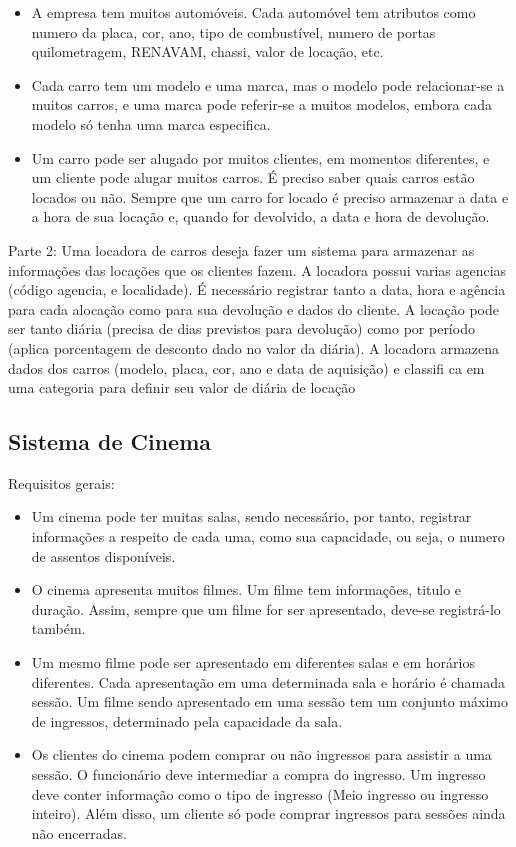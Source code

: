 \documentclass[a4paper,10pt]{article}
\begin{document}
\begin{itemize}
	\item A empresa tem muitos automóveis. Cada automóvel tem atributos como numero da placa, cor, ano, tipo de combustível, numero de portas quilometragem, RENAVAM, chassi, valor de locação, etc.
	\item  Cada carro tem um modelo e uma marca, mas o modelo pode relacionar-se a muitos carros, e uma marca pode referir-se a muitos modelos, embora cada modelo só tenha uma marca especifica.
	\item Um carro pode ser alugado por muitos clientes, em momentos diferentes, e um cliente pode alugar muitos carros. É preciso saber quais carros estão locados ou não. Sempre que um carro for locado é preciso armazenar a data e a hora de sua locação e, quando for devolvido, a data e hora de devolução.
\end{itemize}

Parte 2: Uma locadora de carros deseja fazer um sistema para armazenar as informações das
locações que os clientes fazem. A locadora possui varias agencias (código agencia, e localidade).
É necessário registrar tanto a data, hora e agência para cada alocação como para sua devolução e
dados do cliente. A locação pode ser tanto diária (precisa de dias previstos para devolução) como
por período (aplica porcentagem de desconto dado no valor da diária). A locadora armazena
dados dos carros (modelo, placa, cor, ano e data de aquisição) e classifi ca em uma categoria para
definir seu valor de diária de locação

\subsection{Sistema de Cinema}

Requisitos gerais:

\begin{itemize}
	\item Um cinema pode ter muitas salas, sendo necessário, por tanto, registrar informações a respeito de cada uma, como sua capacidade, ou seja, o numero de assentos disponíveis.
	\item O cinema apresenta muitos filmes. Um filme tem informações, titulo e duração. Assim, sempre que um filme for ser apresentado, deve-se registrá-lo também.
	\item Um mesmo filme pode ser apresentado em diferentes salas e em horários diferentes. Cada apresentação em uma determinada sala e horário é chamada sessão. Um filme sendo apresentado em uma sessão tem um conjunto máximo de ingressos, determinado pela capacidade da sala.
	\item Os clientes do cinema podem comprar ou não ingressos para assistir a uma sessão. O
funcionário deve intermediar a compra do ingresso. Um ingresso deve conter informação
como o tipo de ingresso (Meio ingresso ou ingresso inteiro). Além disso, um cliente só pode
comprar ingressos para sessões ainda não encerradas.
\end{itemize}
\end{document}
